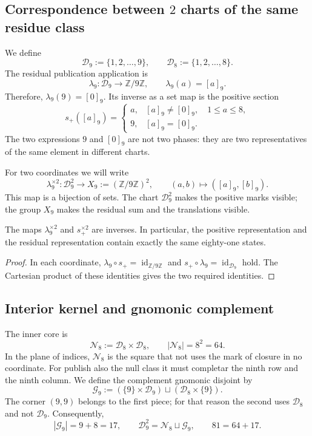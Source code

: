 \subsection{Correspondence between \(2\) charts of the same residue class}

We define
\[
 \mathcal D_9:=\{1,2,\ldots,9\},
 \qquad
 \mathcal D_8:=\{1,2,\ldots,8\}.
\]
The residual publication application is
\[
 \lambda_9:\mathcal D_9\longrightarrow\mathbb Z/9\mathbb Z,
 \qquad
 \lambda_9(a)=[a]_9.
\]
Therefore, \(\lambda_9(9)=[0]_9\). Its inverse as a set map is the positive section
\[
 s_+([a]_9)=
 \begin{cases}
  a,&[a]_9\neq[0]_9,\quad 1\leq a\leq8,\\
  9,&[a]_9=[0]_9.
 \end{cases}
\]
The two expressions \(9\) and \([0]_9\) are not two phases: they are two
representatives of the same element in different charts.

For two coordinates we will write
\[
 \lambda_9^{\times2}:\mathcal D_9^2
       \longrightarrow X_9:=(\mathbb Z/9\mathbb Z)^2,
 \qquad
 (a,b)\longmapsto([a]_9,[b]_9).
\]
This map is a bijection of sets. The chart
\(\mathcal D_9^2\) makes the positive marks visible; the group \(X_9\)
makes the residual sum and the translations visible.

\begin{lemma}
\label{p12-83-c1-s2:lem:app-cambio-carta-sin-perdida}
The maps \(\lambda_9^{\times2}\) and
\(s_+^{\times2}\) are inverses. In particular, the positive representation and the
residual representation contain exactly the same eighty-one states.
\end{lemma}

\begin{proof}
In each coordinate,
\(\lambda_9\circ s_+=\operatorname{id}_{\mathbb Z/9\mathbb Z}\) and
\(s_+\circ\lambda_9=\operatorname{id}_{\mathcal D_9}\) hold. The Cartesian product of these identities gives the two required identities.
\end{proof}

\subsection{Interior kernel and gnomonic complement}

The inner core is
\[
 \mathcal N_8:=\mathcal D_8\times\mathcal D_8,
 \qquad |\mathcal N_8|=8^2=64.
\]
In the plane of indices, \(\mathcal N_8\) is the square that not uses the
mark of closure in no coordinate. For publish also the null class
it must completar the ninth row and the ninth column. We define the
complement gnomonic disjoint by
\[
 \mathcal G_9:=
  (\{9\}\times\mathcal D_9)
  \sqcup
  (\mathcal D_8\times\{9\}).
\]
The corner \((9,9)\) belongs to the first piece; for that reason the second uses
\(\mathcal D_8\) and not \(\mathcal D_9\). Consequently,
\[
 |\mathcal G_9|=9+8=17,
 \qquad
 \mathcal D_9^2=\mathcal N_8\sqcup\mathcal G_9,
 \qquad
 81=64+17.
\]

